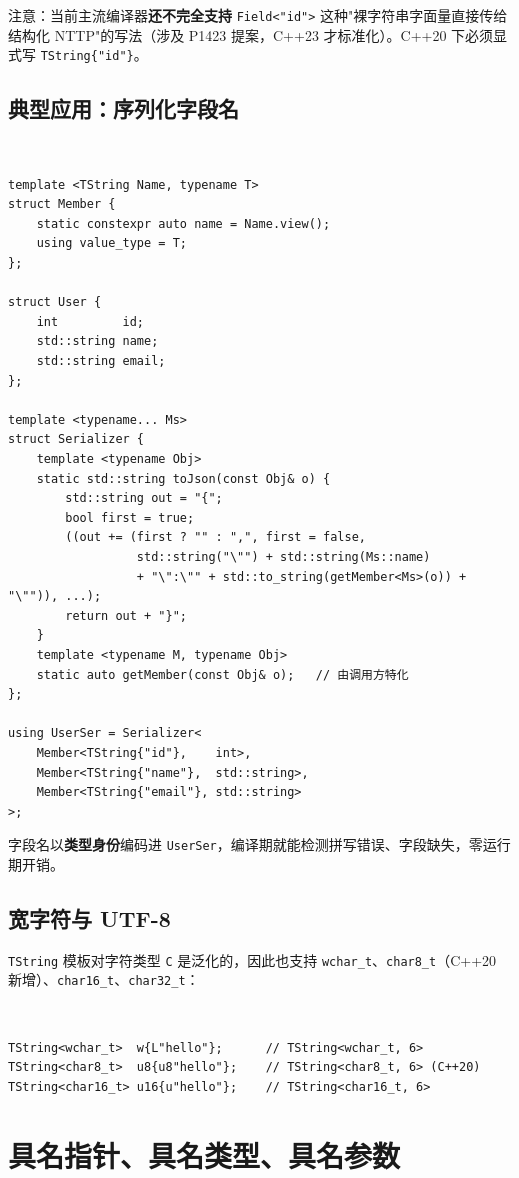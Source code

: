 \documentclass[12pt,a4paper,fontset=fandol]{ctexbook}
\newcommand{\cpplabel}{%
  \tcbox[on line,colback=cppheadbg,colframe=cppheadbg,
    boxrule=0pt,arc=1pt,left=2pt,right=2pt,top=1pt,bottom=1pt,
    colupper=white,fontupper=\scriptsize\bfseries]{C++}}
\newcommand{\cppxxlabel}[1]{%
  \tcbox[on line,colback=cpp20bg,colframe=cpp20bg,
    boxrule=0pt,arc=1pt,left=2pt,right=2pt,top=1pt,bottom=1pt,
    colupper=white,fontupper=\scriptsize\bfseries]{#1}}
\newcommand{\cpp}[1]{C++#1}
\newcommand{\kw}[1]{\texttt{#1}}
\begin{document}
注意：当前主流编译器\textbf{还不完全支持} \kw{Field<"id">} 这种"裸字符串字面量直接传给结构化 NTTP"的写法（涉及 P1423 提案，C++23 才标准化）。C++20 下必须显式写 \kw{TString\{"id"\}}。

\section{典型应用：序列化字段名}

\cppxxlabel{C++20}\ \begin{lstlisting}
template <TString Name, typename T>
struct Member {
    static constexpr auto name = Name.view();
    using value_type = T;
};

struct User {
    int         id;
    std::string name;
    std::string email;
};

template <typename... Ms>
struct Serializer {
    template <typename Obj>
    static std::string toJson(const Obj& o) {
        std::string out = "{";
        bool first = true;
        ((out += (first ? "" : ",", first = false,
                  std::string("\"") + std::string(Ms::name)
                  + "\":\"" + std::to_string(getMember<Ms>(o)) + "\"")), ...);
        return out + "}";
    }
    template <typename M, typename Obj>
    static auto getMember(const Obj& o);   // 由调用方特化
};

using UserSer = Serializer<
    Member<TString{"id"},    int>,
    Member<TString{"name"},  std::string>,
    Member<TString{"email"}, std::string>
>;
\end{lstlisting}

字段名以\textbf{类型身份}编码进 \kw{UserSer}，编译期就能检测拼写错误、字段缺失，零运行期开销。

\section{宽字符与 UTF-8}

\kw{TString} 模板对字符类型 \kw{C} 是泛化的，因此也支持 \kw{wchar\_t}、\kw{char8\_t}（\cpp{20} 新增）、\kw{char16\_t}、\kw{char32\_t}：

\cpplabel\ \begin{lstlisting}
TString<wchar_t>  w{L"hello"};      // TString<wchar_t, 6>
TString<char8_t>  u8{u8"hello"};    // TString<char8_t, 6> (C++20)
TString<char16_t> u16{u"hello"};    // TString<char16_t, 6>
\end{lstlisting}

\chapter{具名指针、具名类型、具名参数}
\end{document}
